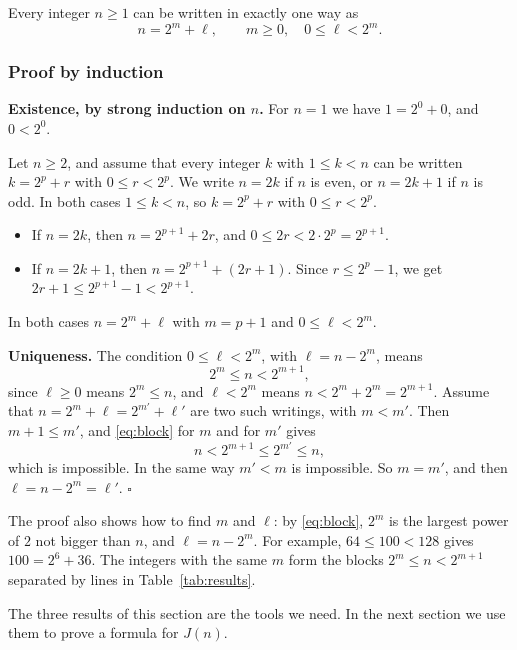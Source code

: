 \begin{obs}\label{obs:decomp}
Every integer $n\geq1$ can be written in exactly one way as
\[
n=2^m+\ell,\qquad m\geq0,\quad 0\leq\ell<2^m .
\]
\end{obs}

\subsubsection{Proof by induction}

\textbf{Existence, by strong induction on $n$.} For $n=1$ we have
$1=2^0+0$, and $0<2^0$.

Let $n\geq2$, and assume that every integer $k$ with $1\leq k<n$ can be
written $k=2^p+r$ with $0\leq r<2^p$. We write $n=2k$ if $n$ is even, or
$n=2k+1$ if $n$ is odd. In both cases $1\leq k<n$, so $k=2^p+r$ with
$0\leq r<2^p$.
\begin{itemize}
  \item If $n=2k$, then $n=2^{p+1}+2r$, and $0\leq2r<2\cdot2^p=2^{p+1}$.
  \item If $n=2k+1$, then $n=2^{p+1}+(2r+1)$. Since $r\leq2^p-1$, we get
        $2r+1\leq2^{p+1}-1<2^{p+1}$.
\end{itemize}
In both cases $n=2^m+\ell$ with $m=p+1$ and $0\leq\ell<2^m$.

\textbf{Uniqueness.} The condition $0\leq\ell<2^m$, with $\ell=n-2^m$, means
\begin{equation}\label{eq:block}
2^m\leq n<2^{m+1},
\end{equation}
since $\ell\geq0$ means $2^m\leq n$, and $\ell<2^m$ means
$n<2^m+2^m=2^{m+1}$. Assume that $n=2^m+\ell=2^{m'}+\ell'$ are two such
writings, with $m<m'$. Then $m+1\leq m'$, and \eqref{eq:block} for $m$ and for
$m'$ gives
\[
n<2^{m+1}\leq2^{m'}\leq n,
\]
which is impossible. In the same way $m'<m$ is impossible. So $m=m'$, and
then $\ell=n-2^m=\ell'$. \hfill$\square$

The proof also shows how to find $m$ and $\ell$: by \eqref{eq:block}, $2^m$ is
the largest power of $2$ not bigger than $n$, and $\ell=n-2^m$. For example,
$64\leq100<128$ gives $100=2^6+36$. The integers with the same $m$ form the
blocks $2^m\leq n<2^{m+1}$ separated by lines in Table~\ref{tab:results}.

The three results of this section are the tools we need. In the next section
we use them to prove a formula for $J(n)$.

